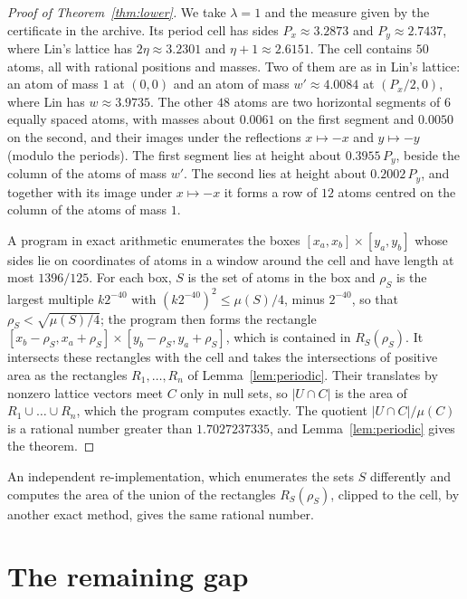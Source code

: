 \documentclass[11pt]{amsart}
\theoremstyle{definition}
\theoremstyle{remark}
\numberwithin{equation}{section}
\newcommand{\LBDEC}{1.7027237335}
\newcommand{\LBATOMS}{50}
\newcommand{\LBROWN}{6}
\newcommand{\LBREACH}{1396/125}
\newcommand{\LBDENEXP}{40}
\newcommand{\LBPX}{3.2873}
\newcommand{\LBPY}{2.7437}
\newcommand{\LBW}{4.0084}
\begin{document}
\begin{proof}[Proof of Theorem~\ref{thm:lower}]
We take $\lambda=1$ and the measure given by the certificate in the archive. Its period cell has sides $P_x\approx\LBPX$ and $P_y\approx\LBPY$, where Lin's lattice has $2\eta\approx3.2301$ and $\eta+1\approx2.6151$. The cell contains $\LBATOMS$ atoms, all with rational positions and masses. Two of them are as in Lin's lattice: an atom of mass $1$ at $(0,0)$ and an atom of mass $w'\approx\LBW$ at $(P_x/2,0)$, where Lin has $w\approx3.9735$. The other $48$ atoms are two horizontal segments of $\LBROWN$ equally spaced atoms, with masses about $0.0061$ on the first segment and $0.0050$ on the second, and their images under the reflections $x\mapsto-x$ and $y\mapsto-y$ (modulo the periods). The first segment lies at height about $0.3955\,P_y$, beside the column of the atoms of mass $w'$. The second lies at height about $0.2002\,P_y$, and together with its image under $x\mapsto-x$ it forms a row of $12$ atoms centred on the column of the atoms of mass $1$.

A program in exact arithmetic enumerates the boxes $[x_a,x_b]\times[y_a,y_b]$ whose sides lie on coordinates of atoms in a window around the cell and have length at most $\LBREACH$. For each box, $S$ is the set of atoms in the box and $\rho_S$ is the largest multiple $k2^{-\LBDENEXP}$ with $(k2^{-\LBDENEXP})^2\le\mu(S)/4$, minus $2^{-\LBDENEXP}$, so that $\rho_S<\sqrt{\mu(S)/4}$; the program then forms the rectangle $[x_b-\rho_S,x_a+\rho_S]\times[y_b-\rho_S,y_a+\rho_S]$, which is contained in $R_S(\rho_S)$. It intersects these rectangles with the cell and takes the intersections of positive area as the rectangles $R_1,\dots,R_n$ of Lemma~\ref{lem:periodic}. Their translates by nonzero lattice vectors meet $C$ only in null sets, so $|U\cap C|$ is the area of $R_1\cup\dots\cup R_n$, which the program computes exactly. The quotient $|U\cap C|/\mu(C)$ is a rational number greater than $\LBDEC$, and Lemma~\ref{lem:periodic} gives the theorem.
\end{proof}

An independent re-implementation, which enumerates the sets $S$ differently and computes the area of the union of the rectangles $R_S(\rho_S)$, clipped to the cell, by another exact method, gives the same rational number.

\section{The remaining gap}\label{sec:gap}
\end{document}
